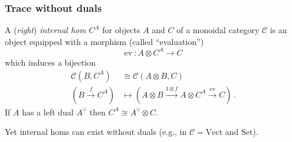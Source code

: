 \documentclass{beamer}
\newcommand{\lra}{\longrightarrow}
\def\CC{{\mathscr C}}
\begin{document}
\begin{frame}
\frametitle{Trace without duals}
A (\emph{right}) \emph{internal hom} $C^A$ for objects $A$ and $C$ of a monoidal category $\CC$ is an object equipped with a morphism (called ``evaluation'')
\[
\mathrm{ev} \ : A \otimes C^A \lra C
\]
which induces a bijection
\begin{align*}
\CC (B,C^A) &\cong \CC (A \otimes B, C)
\\
(B  \stackrel{f}{\lra} C^A) 
  &\longmapsto (A \otimes B \stackrel{1 \otimes f}{\lra} 
  A \otimes C^A \stackrel{\mathrm{ev}}{\lra}   C)\,. 
\end{align*}
If $A$ has a left dual $A^{\vee}$ then $C^A \cong A^{\vee}\otimes C$.  

Yet internal homs can exist without duals (e.g., in $\CC = \mathrm{Vect} $ and $ \mathrm{Set} $).

\end{frame}
\end{document}
